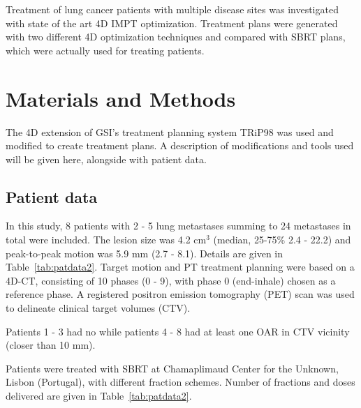 Treatment of lung cancer patients  with multiple disease sites was investigated with state of the art 4D IMPT optimization. 
Treatment plans were generated with two different 4D optimization techniques and compared with SBRT plans, which were actually used for treating patients.


\newpage
\section{Materials and Methods}

The 4D extension of GSI's treatment planning system TRiP98 \cite{Kraemer2000a, Richter2013} was used and modified to create treatment plans. A description of modifications and tools used will be given here, 
alongside with patient data.

\subsection{Patient data}


In this study, 8 patients with 2 - 5 lung metastases summing to 24 metastases in total were included. The lesion size was 4.2 cm$^3$ (median, 25-75\% 2.4 - 22.2) and peak-to-peak motion was 5.9 mm (2.7 - 8.1). 
Details are given in Table~\ref{tab:patdata2}.
Target motion and PT treatment planning were based on a 4D-CT, consisting of 10 phases (0 - 9), with phase 0 (end-inhale) chosen as a reference phase.
A registered positron emission tomography (PET) scan was used to delineate clinical target volumes (CTV). 

Patients 1 - 3 had no while patients 4 - 8 had at least one OAR in CTV vicinity (closer than 10 mm).

Patients were treated with SBRT at Chamaplimaud Center for the Unknown, Lisbon (Portugal), with different fraction schemes. 
Number of fractions and doses delivered are given in Table~\ref{tab:patdata2}.

\newpage


